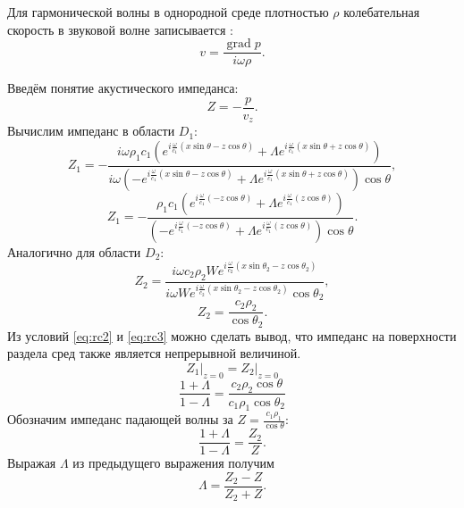 \documentclass[a4paper, fontsize=14pt]{article}
\newcommand{\gradop}{\operatorname{grad}}
\begin{document}
	Для гармонической волны в однородной среде плотностью $\rho$ колебательная скорость в звуковой волне записывается \cite{landavshic}:
	\begin{equation}
		v = \frac{\gradop p}{i\omega \rho}.
	\end{equation}
	
	Введём понятие акустического импеданса:
	\begin{equation}
		Z = -\frac{p}{v_z}.
	\end{equation}
	Вычислим импеданс в области $D_1$:
	\begin{equation}
		Z_1 = -\frac{i\omega \rho_1 c_1 (e^{i\frac{\omega}{c_1}(x\sin \theta - z\cos \theta)}+\Lambda e^{i\frac{\omega}{c_1}(x\sin \theta + z\cos \theta)})}{i\omega(-e^{i\frac{\omega}{c_1}(x\sin \theta - z\cos \theta)}+\Lambda e^{i\frac{\omega}{c_1}(x\sin \theta + z\cos \theta)}) \cos \theta },
	\end{equation}
	\begin{equation}
		Z_1 = -\frac{ \rho_1 c_1 (e^{i\frac{\omega}{c_1}(- z\cos \theta)}+\Lambda e^{i\frac{\omega}{c_1}( z\cos \theta)})}{(-e^{i\frac{\omega}{c_1}( - z\cos \theta)}+\Lambda e^{i\frac{\omega}{c_1}(z\cos \theta)}) \cos \theta }.
		\label{eq:impz1}
	\end{equation} 
	Аналогично для области $D_2$:
	\begin{equation}
		Z_2 = \frac{i\omega c_2 \rho_2 W e^{i\frac{\omega}{c_2}(x\sin \theta_2 - z\cos \theta_2)}}{i\omega W e^{i\frac{\omega}{c_2}(x\sin \theta_2 - z\cos \theta_2)}\cos \theta_2},
	\end{equation}
	\begin{equation}
		Z_2 = \frac{ c_2 \rho_2 }{ \cos \theta_2}.
	\end{equation}
	Из условий \eqref{eq:rc2} и \eqref{eq:rc3} можно сделать вывод, что импеданс на поверхности раздела сред также является непрерывной величиной.
	\begin{equation}
		\left.Z_1\right|_{z=0} = \left. Z_2 \right|_{z=0}
	\end{equation}
	\begin{equation}
		\frac{1+\Lambda }{1-\Lambda } = \frac{c_2 \rho_2 \cos \theta }{c_1 \rho_1 \cos \theta_2 }
	\end{equation}
	Обозначим импеданс падающей волны за $Z = \frac{c_1\rho_1}{\cos \theta}$:
	\begin{equation}
		\frac{1+\Lambda }{1-\Lambda } = \frac{Z_2 }{Z}.
	\end{equation}
	Выражая $\Lambda $ из предыдущего выражения получим
	\begin{equation}
		\Lambda =\frac{Z_2-Z}{Z_2+Z}.
		\label{eq:lambdaZ}
	\end{equation}
\end{document}
